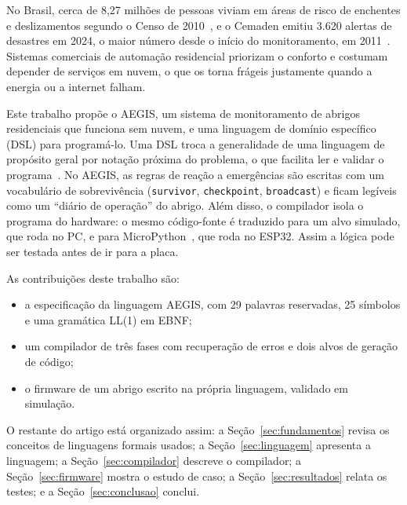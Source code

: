 \documentclass[conference]{IEEEtran}
\begin{document}
No Brasil, cerca de 8,27 milhões de pessoas viviam em áreas de risco de
enchentes e deslizamentos segundo o Censo de 2010~\cite{ibge2018}, e o
Cemaden emitiu 3.620 alertas de desastres em 2024, o maior número desde o
início do monitoramento, em 2011~\cite{cemaden2024}. Sistemas comerciais de automação
residencial priorizam o conforto e costumam depender de serviços em
nuvem, o que os torna frágeis justamente quando a energia ou a internet
falham.

Este trabalho propõe o AEGIS, um sistema de monitoramento de abrigos
residenciais que funciona sem nuvem, e uma linguagem de domínio
específico (DSL) para programá-lo. Uma DSL troca a generalidade de uma
linguagem de propósito geral por notação próxima do problema, o que
facilita ler e validar o programa~\cite{mernik2005,fowler2010}. No
AEGIS, as regras de reação a emergências são escritas com um vocabulário
de sobrevivência (\texttt{survivor}, \texttt{checkpoint},
\texttt{broadcast}) e ficam legíveis como um ``diário de operação'' do
abrigo. Além disso, o compilador isola o programa do hardware: o mesmo
código-fonte é traduzido para um alvo simulado, que roda no PC, e para
MicroPython~\cite{micropython}, que roda no ESP32. Assim a lógica pode
ser testada antes de ir para a placa.

As contribuições deste trabalho são:
\begin{itemize}
  \item a especificação da linguagem AEGIS, com 29 palavras reservadas,
        25 símbolos e uma gramática LL(1) em EBNF;
  \item um compilador de três fases com recuperação de erros e dois alvos
        de geração de código;
  \item o firmware de um abrigo escrito na própria linguagem, validado em
        simulação.
\end{itemize}

O restante do artigo está organizado assim: a Seção~\ref{sec:fundamentos}
revisa os conceitos de linguagens formais usados; a
Seção~\ref{sec:linguagem} apresenta a linguagem; a
Seção~\ref{sec:compilador} descreve o compilador; a
Seção~\ref{sec:firmware} mostra o estudo de caso; a
Seção~\ref{sec:resultados} relata os testes; e a
Seção~\ref{sec:conclusao} conclui.

\end{document}
